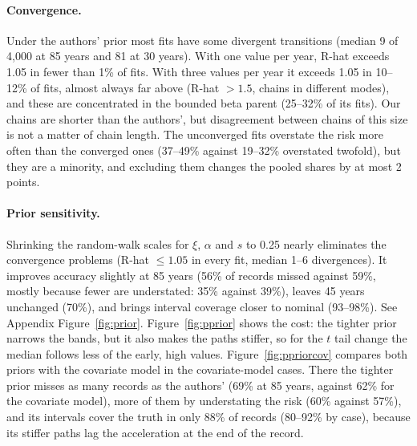 \documentclass[11pt]{article}
\begin{document}
\paragraph{Convergence.}
Under the authors' prior most fits have some divergent transitions (median 9 of 4,000 at
85 years and 81 at 30 years). With one value per year, R-hat exceeds 1.05 in fewer than 1\% of
fits. With three values per year it exceeds 1.05 in 10--12\% of fits, almost always far above
(R-hat $>1.5$, chains in different modes), and these are concentrated in the bounded beta parent
(25--32\% of its fits). Our chains are shorter than the authors', but disagreement between chains
of this size is not a matter of chain length. The unconverged fits overstate the risk more often than the converged ones (37--49\% against
19--32\% overstated twofold), but they are a minority, and excluding them changes the pooled shares
by at most 2 points.

\paragraph{Prior sensitivity.}
Shrinking the random-walk scales for $\xi$, $\alpha$ and $s$ to 0.25 nearly eliminates the
convergence problems (R-hat $\le1.05$ in every fit, median 1--6 divergences). It improves accuracy
slightly at 85 years (56\% of records missed against 59\%, mostly because fewer are understated:
35\% against 39\%), leaves 45 years unchanged (70\%), and brings interval coverage closer to nominal (93--98\%). See Appendix Figure~\ref{fig:prior}.
Figure~\ref{fig:pprior} shows the cost: the tighter prior narrows the bands, but it also makes the
paths stiffer, so for the $t$ tail change the median follows less of the early, high values.
Figure~\ref{fig:ppriorcov} compares both priors with the covariate model in the covariate-model
cases. There the tighter prior misses as many records as the authors' (69\% at 85 years, against
62\% for the covariate model), more of them by understating the risk (60\% against 57\%), and its
intervals cover the truth in only 88\% of records (80--92\% by
case), because its stiffer paths lag the acceleration at the end of the record.
\end{document}
